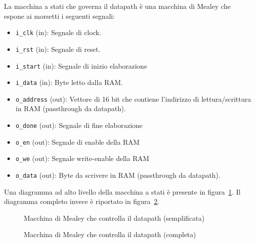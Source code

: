 \documentclass[a4paper,11pt]{article}
\begin{document}
La macchina a stati che governa il datapath è una macchina di Mealey che
espone ai morsetti i seguenti segnali:

\begin{itemize}
  \item \texttt{i\_clk} (in): Segnale di clock.
  \item \texttt{i\_rst} (in): Segnale di reset.
  \item \texttt{i\_start} (in): Segnale di inizio elaborazione
  \item \texttt{i\_data} (in): Byte letto dalla RAM.
  \item \texttt{o\_address} (out): Vettore di 16 bit che contiene l'indirizzo
    di lettura/scrittura in RAM (passthrough da datapath).
  \item \texttt{o\_done} (out): Segnale di fine elaborazione
  \item \texttt{o\_en} (out): Segnale di enable della RAM
  \item \texttt{o\_we} (out): Segnale write-enable della RAM
  \item \texttt{o\_data} (out): Byte da scrivere in RAM (passthrough da
    datapath).
\end{itemize}

Una diagramma ad alto livello della macchina a stati è presente in
figura~\ref{fig:fsm-simplified}. Il diagramma completo invece è riportato in
figura~\ref{fig:fsm}.

\begin{figure}[htb]
  \centering
  \caption{Macchina di Mealey che controlla il datapath (semplificata)}%
  \label{fig:fsm-simplified}
\end{figure}

\begin{figure}
  \centering
  \caption{Macchina di Mealey che controlla il datapath (completa)}%
  \label{fig:fsm}
\end{figure}
\end{document}
